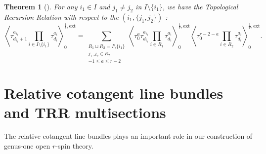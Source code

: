 \documentclass[11pt]{amsart}
\newtheorem{thm}[dummy]{Theorem}
\theoremstyle{definition}
\theoremstyle{remark}
\newcommand{\<}{\left<}
\renewcommand{\>}{\right>}
\numberwithin{equation}{section}
\begin{document}
 \begin{thm}[{\cite[Lemma 3.6]{BCT_Closed_Extended}}] \label{thm trr closed extended}  
 For any $i_1\in I$ and $j_1\ne j_2$ in $I\setminus \{i_1\}$, we have the Topological Recursion Relation with respect to the $(i_1,\{j_1,j_2\})$%
:
\begin{equation}\label{eq trr closed extended}
    \left\langle\tau^{a_{i_1}}_{d_{i_1}+1}\prod_{i\in I\setminus \{i_1\}}\tau^{a_i}_{d_i}\right\rangle^{\frac{1}{r},\text{ext}}_0=
    \sum_{\substack{R_1\sqcup R_2=I\setminus\{i_1\}\\j_1,j_2\in R_2\\-1 \le a \le r-2}} 
    \left\langle\tau^a_0 \tau^{a_{i_1}}_{d_{i_1}} \prod_{i\in R_1}\tau^{a_i}_{d_i}\right\rangle^{\frac{1}{r},\text{ext}}_0 
    \left\langle\tau^{r-2-a}_0\prod_{i\in R_2}\tau^{a_i}_{d_i}\right\rangle^{\frac{1}{r},\text{ext}}_0.
\end{equation}
     
 \end{thm}


\section{Relative cotangent line bundles and TRR multisections}\label{sec relative  cotangent and all}
The %
relative cotangent line bundles plays an important role in our construction of genus-one open $r$-spin theory.
\end{document}
